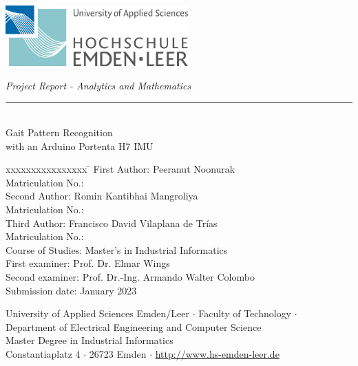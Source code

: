 %
%

\begin{titlepage}
	
	\begin{flushleft} 
		\includegraphics[width=7cm] {Images/Logo.png}
	\end{flushleft} 
	
	\begin{flushright}
		\vspace{2cm}
		\LARGE \textsl{Project Report - Analytics and Mathematics}\\
		\rule{0.6\textwidth}{0.4pt} ~\\
		\vspace{0.5cm}
		\textsf{\LARGE Gait Pattern Recognition}\\
		\textsf{\LARGE with an Arduino Portenta H7 IMU}
	\end{flushright}
	
	\vspace{1cm}
	\large
	\begin{tabbing}
		xxxxxxxxxxxxxxxx \= \kill
		First Author: \> Peeranut Noonurak \\
		Matriculation No.:  \\
		
		Second Author: \> Romin Kantibhai Mangroliya  \\
		Matriculation No.:  \\
		
		Third Author: \> Francisco David Vilaplana de Trías\\
		Matriculation No.:  \\ 
		Course of Studies: \> Master's in Industrial Informatics \\ [0.5cm]
		
		First examiner: \> Prof. Dr. Elmar Wings \\
		Second examiner: \> Prof. Dr.-Ing. Armando Walter Colombo \\ [0.5cm]
		Submission date:  January 2023 \\
	\end{tabbing}
	
	\small
	\begin{center}
		University of Applied Sciences Emden/Leer $\cdot$ 
		Faculty of Technology $\cdot$ \\
		Department of Electrical Engineering and Computer Science \\
		Master Degree in Industrial Informatics\\
		Constantiaplatz 4 $\cdot$ 
		26723 Emden $\cdot$ 
		\url{http://www.hs-emden-leer.de}
	\end{center}
	
\end{titlepage}
